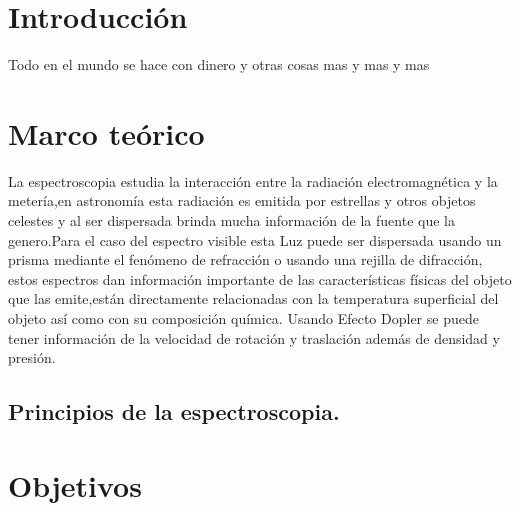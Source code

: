 \documentclass[11pt]{article}
\begin{document}
\section{Introducci\'on}

Todo en el mundo se hace con dinero y otras cosas mas y mas y mas












\section{Marco teórico}
La espectroscopia estudia la interacción entre la radiación electromagnética y la metería,en astronomía esta radiación es emitida por estrellas y otros objetos celestes y al ser dispersada brinda mucha información de la fuente que la genero.Para el caso del espectro visible esta Luz puede ser dispersada usando un prisma mediante el fenómeno de refracción o usando una rejilla de difracción, estos espectros dan información importante de las características físicas del objeto que las emite,están directamente relacionadas con la temperatura superficial del objeto así como con su composición química. Usando Efecto Dopler se puede tener información de la velocidad de rotación y traslación además de densidad y presión.
\cite{moreira2009modelo}\\



\subsection {Principios de la espectroscopia.}






\section{Objetivos}
\end{document}
